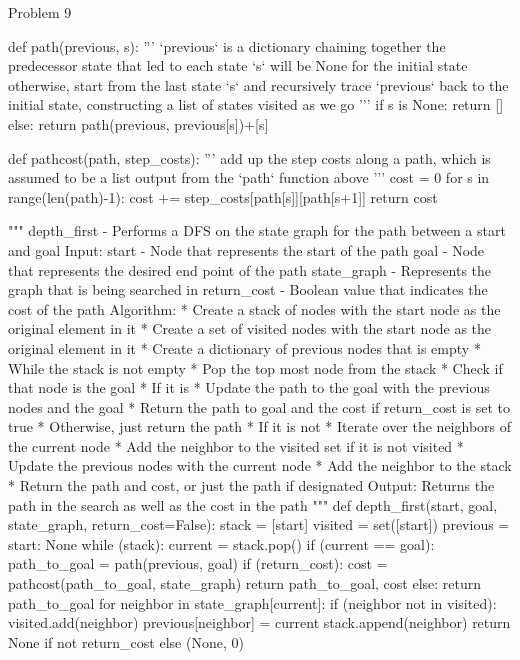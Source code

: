 \begin{problem}{Problem 9}
\begin{highlight}[Solution]
\begin{code}[Python]
    def path(previous, s): 
        '''
        `previous` is a dictionary chaining together the predecessor state that led to each state
        `s` will be None for the initial state
        otherwise, start from the last state `s` and recursively trace `previous` back to the initial state,
        constructing a list of states visited as we go
        '''
        if s is None:
            return []
        else:
            return path(previous, previous[s])+[s]
    
    def pathcost(path, step_costs):
        '''
        add up the step costs along a path, which is assumed to be a list output from the `path` function above
        '''
        cost = 0
        for s in range(len(path)-1):
            cost += step_costs[path[s]][path[s+1]]
        return cost
    
    
    """ depth_first - Performs a DFS on the state graph for the path between a start and goal
        Input:
            start - Node that represents the start of the path
            goal - Node that represents the desired end point of the path
            state_graph - Represents the graph that is being searched in
            return_cost - Boolean value that indicates the cost of the path
        Algorithm:
            * Create a stack of nodes with the start node as the original element in it
            * Create a set of visited nodes with the start node as the original element in it
            * Create a dictionary of previous nodes that is empty
            * While the stack is not empty
                * Pop the top most node from the stack
                * Check if that node is the goal
                * If it is
                    * Update the path to the goal with the previous nodes and the goal
                    * Return the path to goal and the cost if return_cost is set to true
                    * Otherwise, just return the path
                * If it is not
                    * Iterate over the neighbors of the current node
                    * Add the neighbor to the visited set if it is not visited
                    * Update the previous nodes with the current node
                    * Add the neighbor to the stack
            * Return the path and cost, or just the path if designated
        Output:
            Returns the path in the search as well as the cost in the path
    """
    def depth_first(start, goal, state_graph, return_cost=False):
        stack = [start]
        visited = set([start])
        previous = {start: None}
        while (stack):
            current = stack.pop()
            if (current == goal):
                path_to_goal = path(previous, goal)
                if (return_cost):
                    cost = pathcost(path_to_goal, state_graph)
                    return path_to_goal, cost
                else:
                    return path_to_goal
            for neighbor in state_graph[current]:
                if (neighbor not in visited):
                    visited.add(neighbor)
                    previous[neighbor] = current
                    stack.append(neighbor)
        return None if not return_cost else (None, 0)
        

\end{code}
\end{highlight}
\end{problem}
